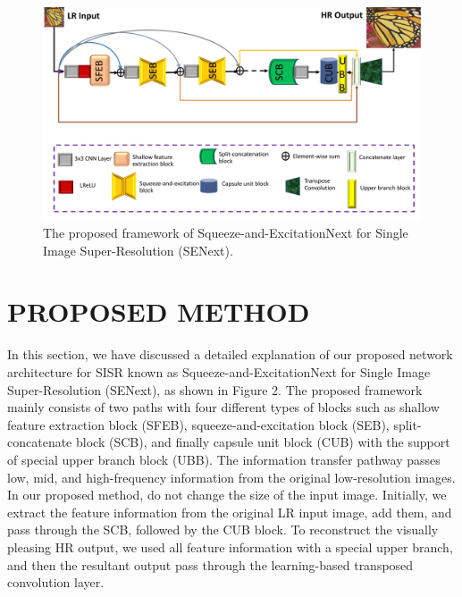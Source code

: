 \documentclass{ieeeaccess}
\begin{document}
\begin{figure}
    \centering

    \includegraphics[width=\linewidth]{2Figure.pdf}
    \caption{The proposed framework of Squeeze-and-ExcitationNext for Single Image Super-Resolution (SENext).}
    \label{fig:2}
\end{figure}

\section{PROPOSED METHOD}
In this section, we have discussed a detailed explanation of our proposed network architecture for SISR known as Squeeze-and-ExcitationNext for Single Image Super-Resolution (SENext), as shown in Figure 2.  The proposed framework mainly consists of two paths with four different types of blocks such as shallow feature extraction block (SFEB), squeeze-and-excitation block (SEB), split-concatenate block (SCB), and finally capsule unit block (CUB) with the support of special upper branch block (UBB). The information transfer pathway passes low, mid, and high-frequency information from the original low-resolution images.
In our proposed method, do not change the size of the input image. Initially, we extract the feature information from the original LR input image, add them, and pass through the SCB, followed by the CUB block. To reconstruct the visually pleasing HR output, we used all feature information with a special upper branch, and then the resultant output pass through the learning-based transposed convolution layer.
\end{document}
